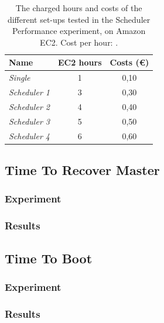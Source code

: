 \documentclass{acm_proc_article-sp}
\begin{document}
\begin{table}
	\centering
	\begin{tabular}{| l | c | c |}
		\hline
		Name & EC2 hours & Costs (\euro) \\ \hline \hline
		\emph{Single} & 1 & 0,10 \\ \hline
		\emph{Scheduler 1} & 3 & 0,30 \\ \hline
		\emph{Scheduler 2} & 4 & 0,40 \\ \hline
		\emph{Scheduler 3} & 5 & 0,50 \\ \hline
		\emph{Scheduler 4} & 6 & 0,60 \\ \hline
	\end{tabular}
	\caption{The charged hours and costs of the different set-ups tested in the Scheduler Performance experiment, on Amazon EC2. Cost per hour: .}
	\label{tbl:costs}
\end{table}

\subsection{Time To Recover Master}

\subsubsection{Experiment}

\subsubsection{Results}

\subsection{Time To Boot}

\subsubsection{Experiment}

\subsubsection{Results}

\end{document}
